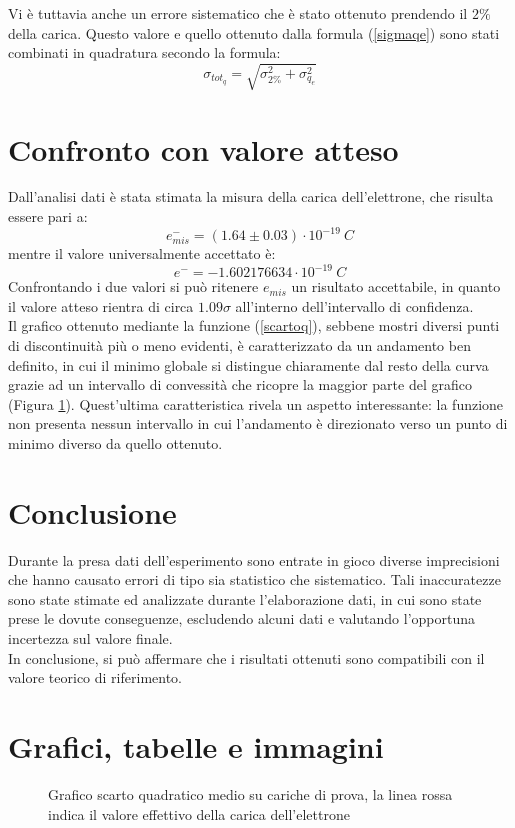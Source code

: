 \documentclass{article}
\begin{document}
Vi è tuttavia anche un errore sistematico che è stato ottenuto prendendo il $2\%$ della carica. Questo valore e quello ottenuto dalla formula (\ref{sigmaqe}) sono stati combinati in quadratura secondo la formula:
\begin{equation}
	\sigma_{tot_q}=\sqrt{\sigma_{2\%}^2+\sigma_{q_e}^2}
\end{equation}

\section{Confronto con valore atteso}
Dall'analisi dati è stata stimata la misura della carica dell'elettrone, che risulta essere pari a: \[e^{-}_{mis}=(1.64 \pm 0.03)\cdot 10^{-19} \ C\] mentre il valore universalmente accettato è: \[e^{-} = -1.602176634 \cdot 10^{-19} \ C\]
Confrontando i due valori si può ritenere \textit{$e_{mis}$} un risultato accettabile, in quanto il valore atteso rientra di circa $1.09\sigma$  all'interno dell'intervallo di confidenza.\\
Il grafico ottenuto mediante la funzione (\ref{scartoq}), sebbene mostri diversi punti di discontinuità più o meno evidenti, è caratterizzato da un andamento ben definito, in cui il minimo globale si distingue chiaramente dal resto della curva grazie ad un intervallo di convessità che ricopre la maggior parte del grafico (Figura \ref{Grafico}). Quest’ultima caratteristica rivela un aspetto interessante: la funzione non presenta nessun intervallo in cui l’andamento è direzionato verso un punto di minimo diverso da quello ottenuto.

\section{Conclusione}
Durante la presa dati dell'esperimento sono entrate in gioco diverse imprecisioni che hanno causato errori di tipo sia statistico che sistematico. Tali inaccuratezze sono state stimate ed analizzate durante l'elaborazione dati, in cui sono state prese le dovute conseguenze, escludendo alcuni dati e valutando l'opportuna incertezza sul valore finale.\\
In conclusione, si può affermare che i risultati ottenuti sono compatibili con il valore teorico di riferimento.

\pagebreak
\section{Grafici, tabelle e immagini}
\begin{figure}[H]
	\center
	
	\caption{Grafico scarto quadratico medio su cariche di prova, la linea rossa indica il valore effettivo della carica dell'elettrone}
	\label{Grafico}
\end{figure}
\end{document}
